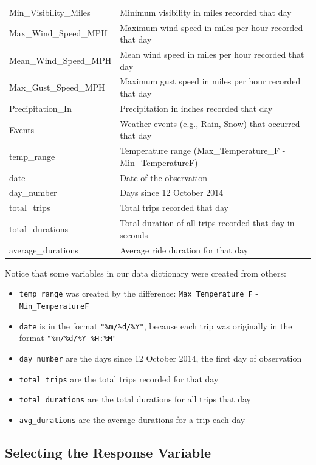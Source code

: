 \documentclass[
]{article}
\begin{document}
\begin{longtable}[]{@{}
  >{\raggedright\arraybackslash}p{}
  >{\raggedright\arraybackslash}p{}@{}}
Min\_Visibility\_Miles & Minimum visibility in miles recorded that
day \\
Max\_Wind\_Speed\_MPH & Maximum wind speed in miles per hour recorded
that day \\
Mean\_Wind\_Speed\_MPH & Mean wind speed in miles per hour recorded that
day \\
Max\_Gust\_Speed\_MPH & Maximum gust speed in miles per hour recorded
that day \\
Precipitation\_In & Precipitation in inches recorded that day \\
Events & Weather events (e.g., Rain, Snow) that occurred that day \\
temp\_range & Temperature range (Max\_Temperature\_F -
Min\_TemperatureF) \\
date & Date of the observation \\
day\_number & Days since 12 October 2014 \\
total\_trips & Total trips recorded that day \\
total\_durations & Total duration of all trips recorded that day in
seconds \\
average\_durations & Average ride duration for that day \\
\end{longtable}

Notice that some variables in our data dictionary were created from
others:

\begin{itemize}
\item \texttt{temp\_range} was created by the difference: \texttt{Max\_Temperature\_F} - \texttt{Min\_TemperatureF}
\item \texttt{date} is in the format \texttt{"\%m/\%d/\%Y"}, because each trip was originally in the format \texttt{"\%m/\%d/\%Y \%H:\%M"}
\item \texttt{day\_number} are the days since 12 October 2014, the first day of observation
\item \texttt{total\_trips} are the total trips recorded for that day
\item \texttt{total\_durations} are the total durations for all trips that day
\item \texttt{avg\_durations} are the average durations for a trip each day
\end{itemize}

\subsection{Selecting the Response
Variable}\label{selecting-the-response-variable}
\end{document}
